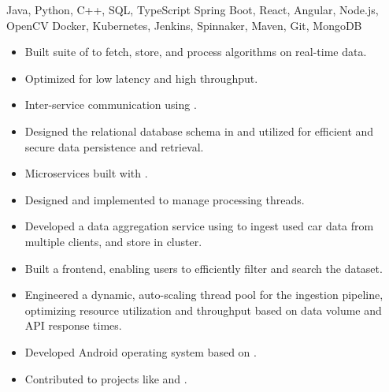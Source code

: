 Java, Python, C++, SQL, TypeScript\newline
{} Spring Boot, React, Angular, Node.js, OpenCV\newline
{} Docker, Kubernetes, Jenkins, Spinnaker, Maven, Git, MongoDB\newline


\begin{itemize}
  \item Built  suite of  to fetch, store, and process algorithms on real-time  data.
  \item Optimized for low latency and high throughput.
  \item Inter-service communication using .
  \item Designed the relational database schema in  and utilized  for efficient and secure data persistence and retrieval.
  \item Microservices built with .
  \item Designed and implemented  to manage processing threads.
 \end{itemize}

\begin{itemize}
    \item Developed a data aggregation service using  to ingest used car data from multiple clients, and store in  cluster.
    \item Built a  frontend, enabling users to efficiently filter and search the dataset.
    \item Engineered a dynamic, auto-scaling thread pool for the ingestion pipeline, optimizing resource utilization and throughput based on data volume and API response times.
 \end{itemize}
 
\begin{itemize}
  \item Developed Android operating system based on .
  \item Contributed to  projects like  and .
 \end{itemize}

